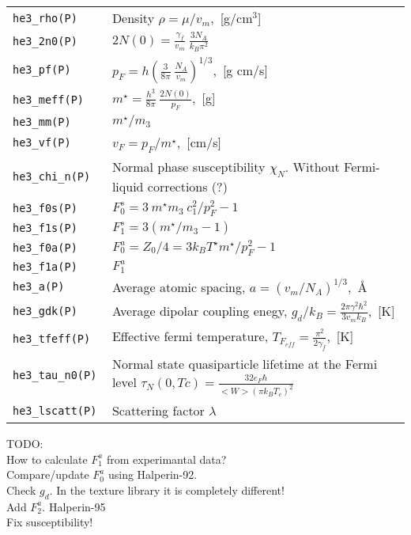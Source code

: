 \documentclass[a4paper]{article}
\begin{document}
\medskip
\begin{tabular}{lp{9cm}}
\tt he3\_rho(P)    & Density $\rho = \mu/v_m$,~[g/cm$^3$]\\
\tt he3\_2n0(P)    & $\displaystyle 2N(0) = \frac{\gamma_f}{v_m}
                     \ \frac{3 N_A}{k_B \pi^2}$\\
\tt he3\_pf(P)     & $\displaystyle p_F = h \left(\frac{3}{8\pi}
                     \ \frac{N_A}{v_m}\right)^{1/3}$,~[g cm/s]\\
\tt he3\_meff(P)   & $\displaystyle m^\star = \frac{h^3}{8\pi}
                     \ \frac{2N(0)}{p_F}$,~[g]\\
\tt he3\_mm(P)     & $m^\star/m_3$\\
\tt he3\_vf(P)     & $\displaystyle v_F = p_F/m^\star$,~[cm/s]\\
\tt he3\_chi\_n(P) & Normal phase susceptibility $\chi_{N}$.\newline
                   Without Fermi-liquid corrections (?)\\
\tt he3\_f0s(P)    &$\displaystyle F_0^s = 3\ m^\star m_3\ c_1^2 / p_F^2 - 1$\\
\tt he3\_f1s(P)    &$\displaystyle F_1^s = 3(m^\star/m_3 - 1)$\\
\tt he3\_f0a(P)    &$\displaystyle F_0^a = Z_0/4 = 3 k_B T^\star m^\star / p_F^2 - 1$\\
\tt he3\_f1a(P)    &$\displaystyle F_1^a$\\


\tt he3\_a(P)      &Average atomic spacing,
                    $\displaystyle a=(v_m/N_A)^{1/3}$,~\AA\\
\tt he3\_gdk(P)    &Average dipolar coupling enegy,
                    $\displaystyle g_d/k_B = \frac{2\pi\gamma^2\hbar^2}{3 v_m k_B}$,~[K]\\
\tt he3\_tfeff(P)  &Effective fermi temperature,
                    $\displaystyle T_{F_{eff}} = \frac{\pi^2}{2\gamma_f}$,~[K]\\
\tt he3\_tau\_n0(P) &Normal state quasiparticle lifetime at the Fermi level\newline
                    $\displaystyle \tau_N(0,Tc) = \frac{32 e_F \hbar}{<W>(\pi k_B T_c)^2}$\\
\tt he3\_lscatt(P) &Scattering factor $\lambda$\\
\end{tabular}
\medskip

\noindent TODO:\\
How to calculate $F_1^a$ from experimantal data?\\
Compare/update $F_0^a$ using Halperin-92.\\
Check $g_d$. In the texture library it is completely different!\\
Add $F_2^a$. Halperin-95\\
Fix susceptibility!
\end{document}
